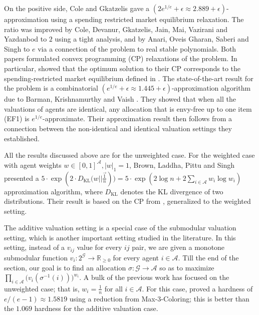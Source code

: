 \documentclass[10pt,a4paper]{article}
\theoremstyle{definition}
\theoremstyle{plain}
\newcommand\calA{{\mathcal{A}}}
\newcommand\calG{{\mathcal{G}}}
\newcommand{\R}{{\mathbb{R}}}
\begin{document}
On the positive side, Cole and Gkatzelis \cite{CG15} gave a $(2e^{1/e} + \epsilon\approx 2.889 + \epsilon)$-approximation using a spending restricted market equilibrium relaxation. The ratio was improved by Cole, Devanur, Gkatzelis, Jain, Mai, Vazirani and Yazdanbod \cite{CDG17} to $2$ using a tight analysis, and by Anari, Oveis Gharan, Saberi and Singh \cite{AGS17} to $e$ via a connection of the problem to real stable polynomials. Both papers formulated convex programming (CP) relaxations of the problem. In particular, \cite{CDG17} showed that the optimum solution to their CP corresponds to the spending-restricted market equilibrium defined in \cite{CG15}.  The state-of-the-art result for the problem is a combinatorial $(e^{1/e}+\epsilon\approx 1.445 + \epsilon)$-approximation algorithm due to Barman, Krishnamurthy and Vaish \cite{BKV18}. They showed that when all the valuations of agents are identical, any allocation that is envy-free up to one item (EF1) is $e^{1/e}$-approximate.  Their approximation result then follows from a connection between the non-identical and identical valuation settings they established. 

All the results discussed above are for the unweighted case.  For the weighted case with agent weights $w \in [0, 1]^\calA, |w|_1 = 1$, Brown, Laddha, Pittu and Singh \cite{BLP24} presented a $5 \cdot \exp(2 \cdot D_{\text{KL}}\Big(w || \frac{\vec{1}}{n})\Big) = 5\cdot \exp(2\log n + 2\sum_{i \in \calA} w_i \log w_i)$ approximation algorithm, where $D_{\text{KL}}$ denotes the KL divergence of two distributions. Their result is based on the CP from \cite{CDG17}, generalized to the weighted setting. 
\smallskip

The additive valuation setting is a special case of the submodular valuation setting, which is another important setting studied in the literature. In this setting, instead of a $v_{ij}$ value for every $ij$ pair, we are given a monotone submodular function $v_i: 2^{\calG} \to \R_{\geq 0}$ for every agent $i \in \calA$. Till the end of the section, our goal is to find an allocation $\sigma: \calG \to \calA$ so as to maximize $\prod_{i \in \calA} \Big(v_i(\sigma^{-1}(i))\Big)^{w_i}$. %
A bulk of the previous work has focused on the unweighted case; that is, $w_i = \frac1n$ for all $i \in \calA$. For this case, \cite{GKK23} proved a hardness of $e/(e-1)\approx 1.5819$ using a reduction from Max-3-Coloring; this is better than the $1.069$ hardness for the additive valuation case. 
\end{document}
